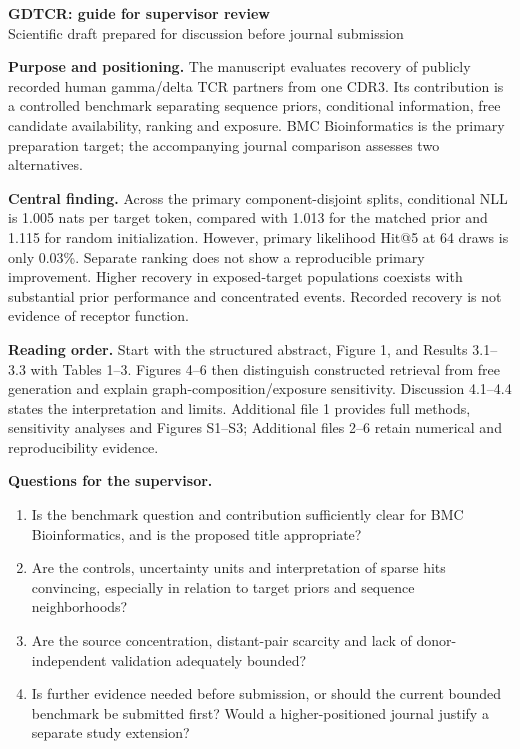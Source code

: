 \documentclass[a4paper,11pt]{article}
\begin{document}
\begin{center}
{\Large\bfseries GDTCR: guide for supervisor review}\\[5pt]
Scientific draft prepared for discussion before journal submission
\end{center}

\textbf{Purpose and positioning.}
The manuscript evaluates recovery of publicly recorded human gamma/delta TCR
partners from one CDR3. Its contribution is a controlled benchmark separating
sequence priors, conditional information, free candidate availability,
ranking and exposure. BMC Bioinformatics is the primary preparation target;
the accompanying journal comparison assesses two alternatives.

\textbf{Central finding.}
Across the primary component-disjoint splits, conditional NLL is 1.005 nats
per target token, compared with 1.013 for the matched prior and 1.115 for
random initialization. However, primary likelihood Hit@5 at 64 draws is only
0.03\%. Separate ranking does not show a reproducible primary improvement.
Higher recovery in exposed-target populations coexists with substantial
prior performance and concentrated events. Recorded recovery is not evidence
of receptor function.

\textbf{Reading order.}
Start with the structured abstract, Figure 1, and Results 3.1--3.3 with
Tables 1--3. Figures 4--6 then distinguish constructed retrieval from free
generation and explain graph-composition/exposure sensitivity.
Discussion 4.1--4.4 states the interpretation and limits.
Additional file 1 provides full methods, sensitivity analyses and Figures
S1--S3; Additional files 2--6 retain numerical and reproducibility evidence.

\textbf{Questions for the supervisor.}
\begin{enumerate}
\setlength{\itemsep}{2pt}
\item Is the benchmark question and contribution sufficiently clear for
BMC Bioinformatics, and is the proposed title appropriate?
\item Are the controls, uncertainty units and interpretation of sparse hits
convincing, especially in relation to target priors and sequence neighborhoods?
\item Are the source concentration, distant-pair scarcity and lack of
donor-independent validation adequately bounded?
\item Is further evidence needed before submission, or should the current
bounded benchmark be submitted first? Would a higher-positioned journal
justify a separate study extension?
\end{enumerate}
\end{document}
